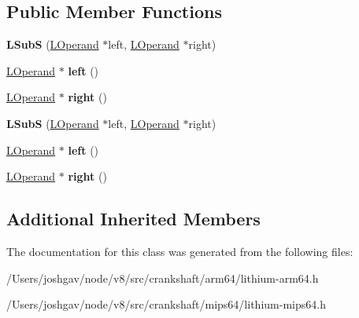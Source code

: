 \subsection*{Public Member Functions}
\begin{DoxyCompactItemize}
\item 
{\bfseries L\+SubS} (\hyperlink{classv8_1_1internal_1_1_l_operand}{L\+Operand} $\ast$left, \hyperlink{classv8_1_1internal_1_1_l_operand}{L\+Operand} $\ast$right)\hypertarget{classv8_1_1internal_1_1_l_sub_s_a6bd8615c2fc2bbe118e0010d404b22b5}{}\label{classv8_1_1internal_1_1_l_sub_s_a6bd8615c2fc2bbe118e0010d404b22b5}

\item 
\hyperlink{classv8_1_1internal_1_1_l_operand}{L\+Operand} $\ast$ {\bfseries left} ()\hypertarget{classv8_1_1internal_1_1_l_sub_s_a4f3bc420efaa18ec03409d5bf33cb1b1}{}\label{classv8_1_1internal_1_1_l_sub_s_a4f3bc420efaa18ec03409d5bf33cb1b1}

\item 
\hyperlink{classv8_1_1internal_1_1_l_operand}{L\+Operand} $\ast$ {\bfseries right} ()\hypertarget{classv8_1_1internal_1_1_l_sub_s_a048ba2934040dea2174541ecdf5b54a4}{}\label{classv8_1_1internal_1_1_l_sub_s_a048ba2934040dea2174541ecdf5b54a4}

\item 
{\bfseries L\+SubS} (\hyperlink{classv8_1_1internal_1_1_l_operand}{L\+Operand} $\ast$left, \hyperlink{classv8_1_1internal_1_1_l_operand}{L\+Operand} $\ast$right)\hypertarget{classv8_1_1internal_1_1_l_sub_s_a6bd8615c2fc2bbe118e0010d404b22b5}{}\label{classv8_1_1internal_1_1_l_sub_s_a6bd8615c2fc2bbe118e0010d404b22b5}

\item 
\hyperlink{classv8_1_1internal_1_1_l_operand}{L\+Operand} $\ast$ {\bfseries left} ()\hypertarget{classv8_1_1internal_1_1_l_sub_s_a4f3bc420efaa18ec03409d5bf33cb1b1}{}\label{classv8_1_1internal_1_1_l_sub_s_a4f3bc420efaa18ec03409d5bf33cb1b1}

\item 
\hyperlink{classv8_1_1internal_1_1_l_operand}{L\+Operand} $\ast$ {\bfseries right} ()\hypertarget{classv8_1_1internal_1_1_l_sub_s_a048ba2934040dea2174541ecdf5b54a4}{}\label{classv8_1_1internal_1_1_l_sub_s_a048ba2934040dea2174541ecdf5b54a4}

\end{DoxyCompactItemize}
\subsection*{Additional Inherited Members}


The documentation for this class was generated from the following files\+:\begin{DoxyCompactItemize}
\item 
/\+Users/joshgav/node/v8/src/crankshaft/arm64/lithium-\/arm64.\+h\item 
/\+Users/joshgav/node/v8/src/crankshaft/mips64/lithium-\/mips64.\+h\end{DoxyCompactItemize}

